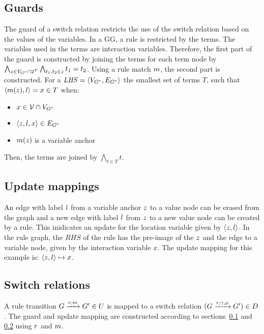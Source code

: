 \subsection{Guards}\label{sec:guards}
The guard of a switch relation restricts the use of the switch relation based on the values of the variables. In a GG, a rule is restricted by the terms. The variables used in the terms are interaction variables. Therefore, the first part of the guard is constructed by joining the terms for each term node by $\bigwedge_{z \in V_{G^r} \cap 2^{\mathcal{T}}}\bigwedge_{t_1, t_2 \in z}t_1 = t_2$. Using a rule match $m$, the second part is constructed. For a $\mathit{LHS} = \langle V_{G^r}, E_{G^r}\rangle$ the smallest set of terms $T$, such that $\langle m(z), l \rangle = x \in T$ when:
\begin{itemize}
\item $x \in \mathcal{V} \cap V_{G^r}$
\item $\langle z, l, x\rangle \in E_{G^r}$
\item $m(z)$ is a variable anchor
\end{itemize}
Then, the terms are joined by $\bigwedge_{t\in T}t$.

\subsection{Update mappings}\label{sec:updates}
An edge with label $l$ from a variable anchor $z$ to a value node can be erased from the graph and a new edge with label $l$ from $z$ to a new value node can be created by a rule. This inidicates an update for the location variable given by $\langle z, l \rangle$. In the rule graph, the $\mathit{RHS}$ of the rule has the pre-image of the $z$ and the edge to a variable node, given by the interaction variable $x$. The update mapping for this example is: $\langle z, l \rangle \mapsto x$.

\subsection{Switch relations}
A rule transition $G \xrightarrow{r, m} G' \in U$ is mapped to a switch relation $(G\xrightarrow{r, \gamma, \rho}G') \in D$. The guard and update mapping are constructed according to sections~\ref{sec:guards} and \ref{sec:updates} using $r$ and $m$.

